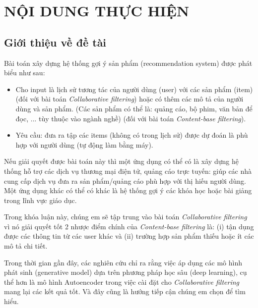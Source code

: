 \documentclass{article}[14pt]
\begin{document}
    \section{NỘI DUNG THỰC HIỆN}
    {

    
    \subsection{Giới thiệu về đề tài}
    
    
      Bài toán xây dựng hệ thống gợi ý sản phẩm (recommendation system) được phát biểu như sau:
      \begin{itemize}
          \item Cho input là lịch sử tương tác của người dùng (user)  với 
          các sản phẩm (item) (đối với bài toán \textit{Collaborative filtering}) 
          hoặc có thêm các mô tả của người dùng và sản phẩm. 
          (Các sản phẩm có thể là: quảng cáo, bộ phim, văn bản để đọc, ... tùy thuộc vào ngành nghề)
          (đối với bài toán \textit{Content-base filtering}).
          \item Yêu cầu: đưa ra tập các items (không có trong lịch sử) 
          được dự đoán là phù hợp với người dùng (tự động làm bằng máy).
      \end{itemize}
      Nếu giải quyết được bài toán này thì một ứng dụng có thể có là xây dựng 
      hệ thống hỗ trợ các dịch vụ thương mại điện tử, quảng cáo trực tuyến: 
      giúp các nhà cung cấp dịch vụ đưa ra sản phẩm/quảng cáo phù hợp với 
      thị hiếu người dùng. Một ứng dụng khác có thể có khác là hệ thống gợi ý các 
      khóa học hoặc bài giảng trong lĩnh vực giáo dục.

      Trong khóa luận này, chúng em sẽ tập trung vào bài toán 
      \textit{Collaborative filtering} vì nó giải quyết tốt 2 nhược điểm chính 
      của \textit{Content-base filtering} là: 
      (i) tận dụng được các thông tin từ các user khác và 
      (ii) trường hợp sản phẩm thiếu hoặc ít các mô tả chi tiết.
      
      Trong thời gian gần đây, các nghiên cứu chỉ ra rằng việc áp dụng các 
      mô hình phát sinh (generative model) dựa trên phương pháp học sâu 
      (deep learning), cụ thể hơn là mô hình Autoencoder trong việc cài đặt cho 
      \textit{Collaborative filtering} mang lại các kết quả tốt. 
      Và đây cũng là hướng tiếp cận chúng em chọn để tìm hiểu.

}
\end{document}

